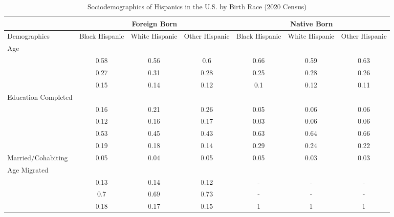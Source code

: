 \begin{table}[ht]
\centering
\caption{Sociodemographics of Hispanics in the U.S. by Birth Race (2020 Census)} 
\begingroup\small
\begin{tabular}{>{\raggedright\arraybackslash}p{3.2cm}|cccccc}
  \hline
  & \multicolumn{3}{c|}{Foreign Born} & \multicolumn{3}{c}{Native Born} \\
\cline{2-7}
Demographics & Black Hispanic & White Hispanic & Other Hispanic & Black Hispanic & White Hispanic & Other Hispanic \\ 
  \hline
Age &  &  &  &  &  &  \\ 
  \multicolumn{1}{>{\raggedleft\arraybackslash}p{1.5cm}|}{\makebox[1.5cm][r]{60 - 69 }}& 0.58 & 0.56 & 0.6 & 0.66 & 0.59 & 0.63 \\ 
  \multicolumn{1}{>{\raggedleft\arraybackslash}p{1.5cm}|}{\makebox[1.5cm][r]{70 - 79 }}& 0.27 & 0.31 & 0.28 & 0.25 & 0.28 & 0.26 \\ 
  \multicolumn{1}{>{\raggedleft\arraybackslash}p{1.5cm}|}{\makebox[1.5cm][r]{80 - 89 }}& 0.15 & 0.14 & 0.12 & 0.1 & 0.12 & 0.11 \\ 
  Education Completed &  &  &  &  &  &  \\ 
  \multicolumn{1}{>{\raggedleft\arraybackslash}p{3.2cm}|}{\makebox[3.2cm][r]{Less than Primary }}& 0.16 & 0.21 & 0.26 & 0.05 & 0.06 & 0.06 \\ 
  \multicolumn{1}{>{\raggedleft\arraybackslash}p{1.7cm}|}{\makebox[1.7cm][r]{Primary }}& 0.12 & 0.16 & 0.17 & 0.03 & 0.06 & 0.06 \\ 
  \multicolumn{1}{>{\raggedleft\arraybackslash}p{2cm}|}{\makebox[2cm][r]{Secondary }}& 0.53 & 0.45 & 0.43 & 0.63 & 0.64 & 0.66 \\ 
  \multicolumn{1}{>{\raggedleft\arraybackslash}p{2cm}|}{\makebox[2cm][r]{University }}& 0.19 & 0.18 & 0.14 & 0.29 & 0.24 & 0.22 \\ 
  Married/Cohabiting & 0.05 & 0.04 & 0.05 & 0.05 & 0.03 & 0.03 \\ 
  Age Migrated &  &  &  &  &  &  \\ 
  \multicolumn{1}{>{\raggedleft\arraybackslash}p{2.4cm}|}{\makebox[2.4cm][r]{Less than 15 }}& 0.13 & 0.14 & 0.12 & - & - & - \\ 
  \multicolumn{1}{>{\raggedleft\arraybackslash}p{1.6cm}|}{\makebox[1.6cm][r]{15 - 49 }}& 0.7 & 0.69 & 0.73 & - & - & - \\ 
  \multicolumn{1}{>{\raggedleft\arraybackslash}p{2.9cm}|}{\makebox[2.9cm][r]{Greater than 50 }}& 0.18 & 0.17 & 0.15 & 1 & 1 & 1 \\ 

\end{tabular}
\end{table}
